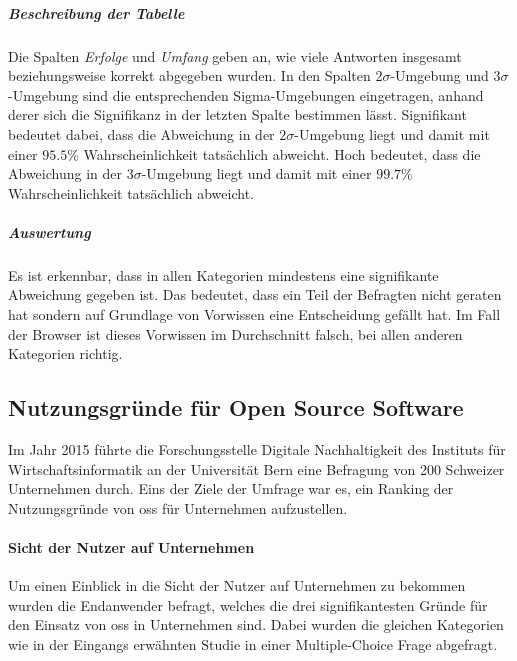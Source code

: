 \documentclass[a4paper]{article}
\begin{document}
                \subparagraph{Beschreibung der Tabelle}
                    Die Spalten \emph{Erfolge} und \emph{Umfang} geben an, wie viele Antworten insgesamt beziehungsweise korrekt abgegeben wurden. In den Spalten $2\sigma$-Umgebung und $3\sigma$-Umgebung sind die entsprechenden Sigma-Umgebungen eingetragen, anhand derer sich die Signifikanz in der letzten Spalte bestimmen lässt. Signifikant bedeutet dabei, dass die Abweichung in der $2\sigma$-Umgebung liegt und damit mit einer $95.5\%$ Wahrscheinlichkeit tatsächlich abweicht. Hoch bedeutet, dass die Abweichung in der $3\sigma$-Umgebung liegt und damit mit einer $99.7\%$ Wahrscheinlichkeit tatsächlich abweicht.
                    
                \subparagraph{Auswertung}
                    Es ist erkennbar, dass in allen Kategorien mindestens eine signifikante Abweichung gegeben ist. Das bedeutet, dass ein Teil der Befragten nicht geraten hat sondern auf Grundlage von Vorwissen eine Entscheidung gefällt hat. Im Fall der Browser ist dieses Vorwissen im Durchschnitt falsch, bei allen anderen Kategorien richtig.
                    
            
        \subsection{Nutzungsgründe für Open Source Software}
            \label{section:usageReasons}
            Im Jahr 2015 führte die Forschungsstelle Digitale Nachhaltigkeit des Instituts für Wirtschaftsinformatik an der Universität Bern eine Befragung von 200 Schweizer Unternehmen durch\cite{oss:studie}. Eins der Ziele der Umfrage war es, ein Ranking der Nutzungsgründe von \gls{oss} für Unternehmen aufzustellen.

            \paragraph{Sicht der Nutzer auf Unternehmen}
                Um einen Einblick in die Sicht der Nutzer auf Unternehmen zu bekommen wurden die Endanwender befragt, welches die drei signifikantesten Gründe für den Einsatz von \gls{oss} in Unternehmen sind. Dabei wurden die gleichen Kategorien wie in der Eingangs erwähnten Studie in einer Multiple-Choice Frage abgefragt.
\end{document}
